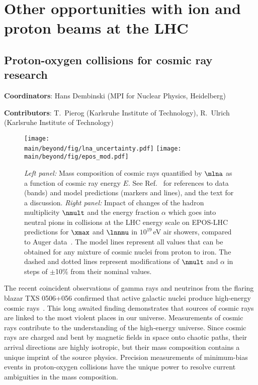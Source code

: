 \documentclass[../report.tex]{subfiles}
\providecommand{\main}{..}
\begin{document}
\section{Other opportunities with ion and proton beams at the LHC}


\clearpage




\clearpage
\subsection{Proton-oxygen collisions for cosmic ray research}
\label{sec:pOcosmic}
{ \small
\noindent \textbf{Coordinators}: Hans Dembinski (MPI for Nuclear Physics, Heidelberg)

\noindent \textbf{Contributors}: 
T.~Pierog (Karlsruhe Institute of Technology), 
R.~Ulrich (Karlsruhe Institute of Technology)
}

\begin{figure}
\texttt{[image: \\main/beyond/fig/lna\_uncertainty.pdf]}
\texttt{[image: \\main/beyond/fig/epos\_mod.pdf]}
\caption{\emph{Left panel:} Mass composition of cosmic rays quantified by $\mlna$ as a function of cosmic ray energy $E$. See Ref.~\cite{kampert_cr_review} for references to data (bands) and model predictions (markers and lines), and the text for a discussion. \emph{Right panel:} Impact of changes of the hadron multiplicity $\nmult$ and the energy fraction $\alpha$ which goes into neutral pions in collisions at the LHC energy scale on EPOS-LHC predictions for $\xmax$ and $\lnnmu$ in $10^{19}$\,\si{eV} air showers, compared to Auger data~\cite{Aab:2014pza}. The model lines represent all values that can be obtained for any mixture of cosmic nuclei from proton to iron. The dashed and dotted lines represent modifications of $\nmult$ and $\alpha$ in steps of $\pm$10\% from their nominal values.}
\label{fig:cosmic_rays}
\end{figure}

The recent coincident observations of gamma rays and neutrinos from the flaring blazar TXS 0506+056 confirmed that active galactic nuclei produce high-energy cosmic rays~\cite{IceCube:2018dnn}. This long awaited finding demonstrates that sources of cosmic rays are linked to the most violent places in our universe. Measurements of cosmic rays contribute to the understanding of the high-energy universe. Since cosmic rays are charged and bent by magnetic fields in space onto chaotic paths, their arrival directions are highly isotropic, but their mass composition contains a unique imprint of the source physics. Precision measurements of minimum-bias events in proton-oxygen collisions have the unique power to resolve current ambiguities in the mass composition.
\end{document}
